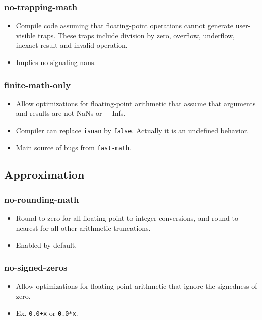 \documentclass{beamer}
\begin{document}
\begin{frame}[fragile]
    \frametitle{no-trapping-math}

    \begin{itemize}
        \item Compile code assuming that floating-point operations cannot generate user-visible traps.
              These traps include division by zero, overflow, underflow, inexact result and invalid operation.
        \item Implies no-signaling-nans.
    \end{itemize}
\end{frame}

\begin{frame}[fragile]
    \frametitle{finite-math-only}

    \begin{itemize}
        \item Allow optimizations for floating-point arithmetic that assume that arguments and results are not NaNs or +-Infs.
        \item Compiler can replace \verb'isnan' by \verb'false'.
              Actually it is an undefined behavior.
        \item Main source of bugs from \verb'fast-math'.
    \end{itemize}
\end{frame}

\subsection{Approximation}

\begin{frame}
    \frametitle{no-rounding-math}

    \begin{itemize}
        \item Round-to-zero for all floating point to integer conversions, and round-to-nearest for all other arithmetic truncations.
        \item Enabled by default.
    \end{itemize}
\end{frame}

\begin{frame}[fragile]
    \frametitle{no-signed-zeros}

    \begin{itemize}
        \item Allow optimizations for floating-point arithmetic that ignore the signedness of zero.
        \item Ex. \verb'0.0+x' or \verb'0.0*x'.
    \end{itemize}
\end{frame}
\end{document}
